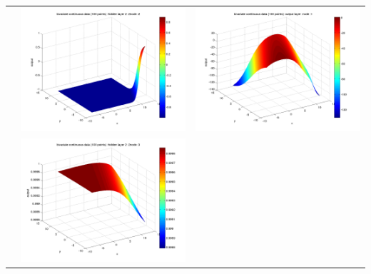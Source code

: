 \documentclass[fleqn]{article}
\begin{document}
\begin{center}
\begin{longtable}{ c | c | r }
     																		&   \includegraphics[scale=0.25]{./pics/bivariate100/_2_4/_2_4_epoch_50_hidden layer 2 :22}  & \includegraphics[scale=0.25]{./pics/bivariate100/_2_4/_2_4_epoch_50_output layer :1}  \\ 
     																		&   \includegraphics[scale=0.25]{./pics/bivariate100/_2_4/_2_4_epoch_50_hidden layer 2 :23} &  \\

\end{longtable}
\end{center}
\end{document}
